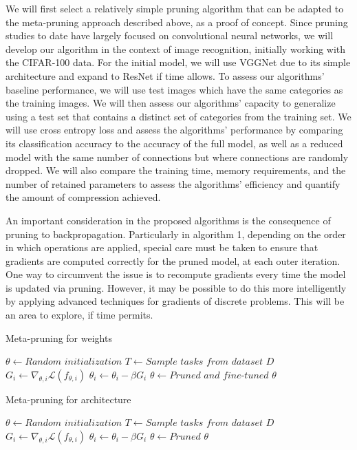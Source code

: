 \documentclass{article}
\begin{document}
We will first select a relatively simple pruning algorithm that can be adapted to the meta-pruning approach described above, as a proof of concept. Since pruning studies to date have largely focused on convolutional neural networks, we will develop our algorithm in the context of image recognition, initially working with the CIFAR-100 data. For the initial model, we will use VGGNet due to its simple architecture and expand to ResNet if time allows. To assess our algorithms' baseline performance, we will use test images which have the same categories as the training images. We will then assess our algorithms' capacity to generalize using a test set that contains a distinct set of categories from the training set. We will use cross entropy loss and assess the algorithms' performance by comparing its classification accuracy to the accuracy of the full model, as well as a reduced model with the same number of connections but where connections are randomly dropped. We will also compare the training time, memory requirements, and the number of retained parameters to assess the algorithms' efficiency and quantify the amount of compression achieved.

An important consideration in the proposed algorithms is the consequence of pruning to backpropagation. Particularly in algorithm 1, depending on the order in which operations are applied, special care must be taken to ensure that gradients are computed correctly for the pruned model, at each outer iteration. One way to circumvent the issue is to recompute gradients every time the model is updated via pruning. However, it may be possible to do this more intelligently by applying advanced techniques for gradients of discrete problems. This will be an area to explore, if time permits.

\begin{algorithm}[t]
	\caption{Meta-pruning for weights} \label{alg1}
	\begin{algorithmic}[1]
		\State $\theta \gets \textit{Random initialization}$
		\State $T \gets \textit{Sample tasks from dataset } D$
		\State $G_i \gets \nabla_{\theta,i} \mathcal{L} \left(f_{\theta,i}\right)$
		\State $\theta_i \gets \theta_i - \beta G_i$
		\EndFor
		\State $\theta \gets \textit{Pruned and fine-tuned } \theta$
		\EndFor
	\end{algorithmic}
\end{algorithm}

\begin{algorithm}[t]
	\caption{Meta-pruning for architecture} \label{alg2}
	\begin{algorithmic}[1]
		\State $\theta \gets \textit{Random initialization}$
		\State $T \gets \textit{Sample tasks from dataset } D$
		\State $G_i \gets \nabla_{\theta,i} \mathcal{L} \left(f_{\theta,i}\right)$
		\State $\theta_i \gets \theta_i - \beta G_i$
		\EndFor
		\State $\theta \gets \textit{Pruned } \theta$
		\EndFor
	\end{algorithmic}
\end{algorithm}
\end{document}
